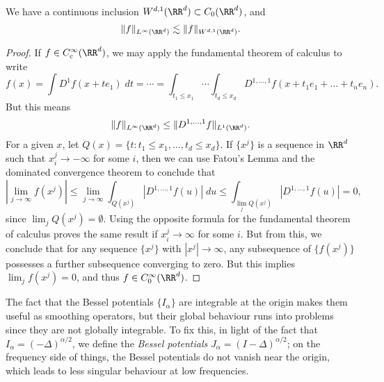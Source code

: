 \begin{lemma}
    We have a continuous inclusion $W^{d,1}(\RR^d) \subset C_0(\RR^d)$, and
    \[ \| f \|_{L^\infty(\RR^d)} \lesssim \| f \|_{W^{d,1}(\RR^d)}. \]
\end{lemma}
\begin{proof}
    If $f \in C_c^\infty(\RR^d)$, we may apply the fundamental theorem of calculus to write
    \[ f(x) = \int D^1 f(x + t e_1)\; dt = \cdots = \int_{t_1 \leq x_1} \cdots \int_{t_d \leq x_d} D^{1,\dots,1} f(x + t_1 e_1 + \dots + t_n e_n). \]
    But this means
    \[ \| f \|_{L^\infty(\RR^d)} \leq \| D^{1,\dots,1} f \|_{L^1(\RR^d)}. \]
    For a given $x$, let $Q(x) = \{ t : t_1 \leq x_1, \dots, t_d \leq x_d \}$.  If $\{ x^j \}$ is a sequence in $\RR^d$ such that $x^j_i \to -\infty$ for some $i$, then we can use Fatou's Lemma and the dominated convergence theorem to conclude that
    \[ \left| \lim_{j \to \infty} f(x^j) \right| \leq \lim_{j \to \infty} \int_{Q(x^j)} |D^{1,\dots,1} f(u)|\; du \leq \int_{\lim_j Q(x^j)} |D^{1,\dots,1} f(u)| = 0, \]
    since $\lim_j Q(x^j) = \emptyset$. Using the opposite formula for the fundamental theorem of calculus proves the same result if $x^j_i \to \infty$ for some $i$. But from this, we conclude that for any sequence $\{ x^j \}$ with $|x^j| \to \infty$, any subsequence of $\{ f(x^j) \}$ possesses a further subsequence converging to zero. But this implies $\lim_j f(x^j) = 0$, and thus $f \in C_0^\infty(\RR^d)$.
\end{proof}

The fact that the Bessel potentials $\{ I_\alpha \}$ are integrable at the origin makes them useful as smoothing operators, but their global behaviour runs into problems since they are not globally integrable. To fix this, in light of the fact that $I_\alpha = (-\Delta)^{\alpha/2}$, we define the \emph{Bessel potentials} $J_\alpha = (I - \Delta)^{\alpha/2}$; on the frequency side of things, the Bessel potentials do not vanish near the origin, which leads to less singular behaviour at low frequencies.

